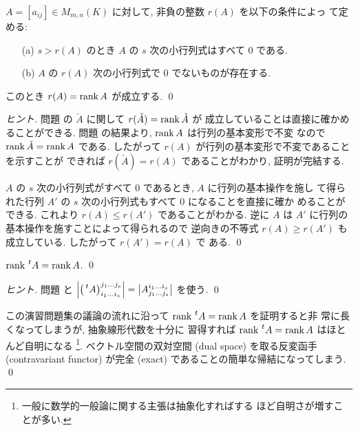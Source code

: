 \documentclass[12pt,twoside]{jarticle}
\begin{document}
\begin{question}
  \label{q:minor-rank}
  $A=[a_{ij}]\in M_{m,n}(K)$ に対して, 非負の整数 $r(A)$ を以下の条件によっ
  て定める:
  \begin{enumerate}
  \item[(a)] $s>r(A)$ のとき $A$ の $s$ 次の小行列式はすべて $0$ である.
  \item[(b)] $A$ の $r(A)$ 次の小行列式で $0$ でないものが存在する.
  \end{enumerate}
  このとき $r(A) = \mathop{\mathrm{rank}}\nolimits A$ が成立する. \qed
\end{question}

\begin{proof}[ヒント]
  問題  の $\check{A}$ に関して $r(\check{A})=\mathop{\mathrm{rank}}\nolimits\check{A}$ が
  成立していることは直接に確かめることができる. 
  問題  の結果より, $\mathop{\mathrm{rank}}\nolimits A$ は行列の基本変形で不変
  なので $\mathop{\mathrm{rank}}\nolimits\check{A}=\mathop{\mathrm{rank}}\nolimits A$ である.
  したがって $r(A)$ が行列の基本変形で不変であることを示すことが
  できれば $r(\check{A})=r(A)$ であることがわかり, 証明が完結する.

  $A$ の $s$ 次の小行列式がすべて $0$ であるとき, $A$ に行列の基本操作を施し
  て得られた行列 $A'$ の $s$ 次の小行列式もすべて $0$ になることを直接に確か
  めることができる.  これより $r(A)\le r(A')$ であることがわかる.
  逆に $A$ は $A'$ に行列の基本操作を施すことによって得られるので
  逆向きの不等式 $r(A)\ge r(A')$ も成立している. したがって $r(A')=r(A)$ で
  ある.
  \qed
\end{proof}


\begin{question}
  \label{q:tp-rank}
  $\rank \tp{A} = \rank A$. \qed
\end{question}

\begin{proof}[ヒント]
  問題  と %
  $\left|\left(\tp{A}\right)^{j_1\ldots j_s}_{i_1\ldots i_s}\right|
  =\left|A^{i_1\ldots i_s}_{j_1\ldots j_s}\right|$ を使う.
  \qed
\end{proof}

\begin{guide}
  この演習問題集の議論の流れに沿って $\rank \tp{A} = \rank A$ を証明すると非
  常に長くなってしまうが, 抽象線形代数を十分に
  習得すれば $\rank \tp{A} = \rank A$ はほとんど自明になる%
  \footnote{一般に数学的一般論に関する主張は抽象化すればする
    ほど自明さが増すことが多い.}.
  ベクトル空間の双対空間 (dual space) を取る反変函手 (contravariant functor) 
  が完全 (exact) であることの簡単な帰結になってしまう. 
  \qed
\end{guide}
\end{document}

